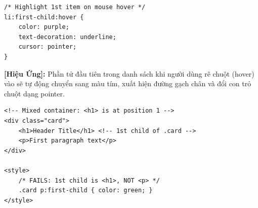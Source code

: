 \begin{codeWindow}
\begin{lstlisting}[language=CSS3]
/* Highlight 1st item on mouse hover */
li:first-child:hover {
    color: purple;
    text-decoration: underline;
    cursor: pointer;
}
\end{lstlisting}
\end{codeWindow}

\begin{tipBox}
\textbf{[Hiệu Ứng]:} Phần tử đầu tiên trong danh sách khi người dùng rê chuột (hover) vào sẽ tự động chuyển sang màu tím, xuất hiện đường gạch chân và đổi con trỏ chuột dạng pointer.
\end{tipBox}

\begin{codeWindow}
\begin{lstlisting}[language=HTML5]
<!-- Mixed container: <h1> is at position 1 -->
<div class="card">
    <h1>Header Title</h1> <!-- 1st child of .card -->
    <p>First paragraph text</p>
</div>

<style>
    /* FAILS: 1st child is <h1>, NOT <p> */
    .card p:first-child { color: green; }
</style>
\end{lstlisting}
\end{codeWindow}

